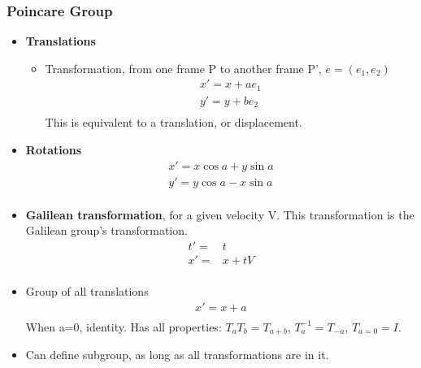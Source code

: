 \subsubsection{Poincare Group}
\begin{itemize}
    \item \textbf{Translations} \cite{ibragimov}
    \begin{itemize}
        \item Transformation, from one frame P to another frame P', $e=(e_1,e_2)$ \cite{ibragimov}
        \begin{equation}\begin{split}
        x'=x+ae_1 \\
        y'=y+be_2 \\
        \end{split}\end{equation}
        This is equivalent to a translation, or displacement.
    \end{itemize}
    \item \textbf{Rotations} \cite{ibragimov}
        \begin{equation}\begin{split}
        x'=x\cos{a}+y\sin{a} \\
        y'=y\cos{a}-x\sin{a} \\
        \end{split}\end{equation}
    \item \textbf{Galilean transformation}, for a given velocity V. This transformation is the Galilean group's transformation. \cite{ibragimov}
    \begin{equation}\begin{split}
    t'=&t \\
    x'=&x+tV \\
    \end{split}\end{equation}
    \item Group of all translations \cite{ibragimov}
    \begin{equation}\begin{split}
    x'=x+a\\
    \end{split}\end{equation}
    When a=0, identity. Has all properties: $T_aT_b=T_{a+b}$, $T_a^{-1}=T_{-a}$, $T_{a=0}=I$.
    \item Can define subgroup, as long as all transformations are in it. \cite{ibragimov}

\end{itemize}
